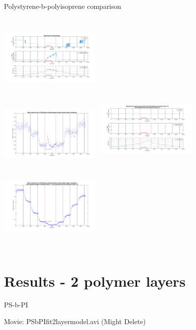 \documentclass[10pt]{beamer}
\begin{document}
\begin{frame}{Polystyrene-b-polyisoprene comparison}
\begin{columns}[t]
	\centering
	\includegraphics[width=5cm,height=3.5cm]{PSbPIsinglemodel1.png}\\
	\includegraphics[width=5cm,height=3.5cm]{PSbPIsinglemodel2.png}
	\centering
	\includegraphics[width=5cm,height=4cm]{PSPIn11n18AVG1.png}\\
	\includegraphics[width=5cm,height=4cm]{PSPIn11n18AVG2.png}
\end{columns}
\end{frame}

	\section{Results - 2 polymer layers}
	
\begin{frame}{PS-b-PI}
\begin{center}
	\huge Movie: PSbPIfit2layermodel.avi (Might Delete)
\end{center}
\end{frame}
\end{document}
